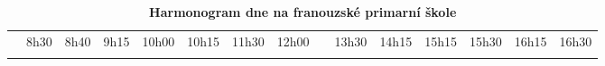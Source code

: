 \begin{landscape}
\begin{table}
	\shorthandoff{-}
	\begin{tabular}{
	 p{1mm} 	%
	|p{6mm}
	|p{20mm}
	|p{25mm}
	|p{7mm}
	|p{30mm}
	|p{1mm} 	%
	|p{5mm} 	%
	|p{1mm} 	%
	|p{23mm}
	|p{30mm}
	|p{8mm}
	|p{23mm}
	|p{8mm}
	|p{8mm}}
		\multicolumn{1}{l}{} &
		\multicolumn{1}{l}{\hspace{-5mm}8h30} & 	%
		\multicolumn{1}{l}{\hspace{-5mm}8h40} &  	%
		\multicolumn{1}{l}{\hspace{-5mm}9h15} & 	%
		\multicolumn{1}{l}{\hspace{-9mm}10h00} &  	%
		\multicolumn{1}{l}{\hspace{-7mm}10h15} &  	%
		\multicolumn{1}{l}{\hspace{-8mm}11h30} &  	%
		\multicolumn{1}{l}{\hspace{0mm}12h00} &
		\multicolumn{1}{l}{} &
		\multicolumn{1}{l}{\hspace{-6mm}13h30} & 	%
		\multicolumn{1}{l}{\hspace{-8mm}14h15} & 	%
		\multicolumn{1}{l}{\hspace{-8mm}15h15} &  	%
		\multicolumn{1}{l}{\hspace{-8mm}15h30} & 	%
		\multicolumn{1}{l}{\hspace{-8mm}16h15} &  	%
		\multicolumn{1}{l}{\hspace{-8mm}16h30}  \\ 	%
		\cline{2-6}\cline{8-8}\cline{10-14}
		 & & & & \cellcolor{gray!50} & & & & & & &  \cellcolor{gray!50}& & &
		\multicolumn{1}{l}{} \\ [15mm]
		\cline{2-6}\cline{8-8}\cline{10-14}
	\end{tabular}
	\hfill
	\caption{\textbf{Harmonogram dne na franouzské primarní škole}}
	\label{mojeTabulka}
\end{table}
\end{landscape}